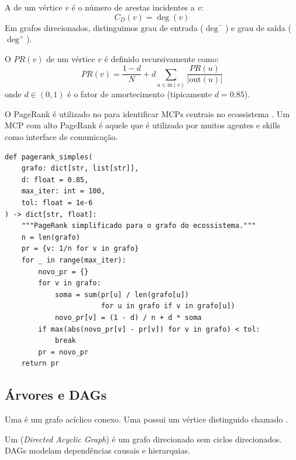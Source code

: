 \begin{definicao}
    A  de um vértice $v$ é o número de
    arestas incidentes a $v$:
    \[
    C_D(v) = \deg(v)
    \]
    Em grafos direcionados, distinguimos grau de entrada ($\deg^-$) e grau
    de saída ($\deg^+$).
\end{definicao}

\begin{definicao}[PageRank]
    O  $PR(v)$ de um vértice $v$ é definido
    recursivamente como:
    \[
    PR(v) = \frac{1-d}{N} + d \sum_{u \in \text{in}(v)}
    \frac{PR(u)}{|\text{out}(u)|}
    \]
    onde $d \in (0,1)$ é o fator de amortecimento (tipicamente $d = 0.85$).
\end{definicao}

\begin{exemplo}
    O PageRank é utilizado no \opencodeeco{} para identificar MCPs centrais
    no ecossistema \cite{opencode2026scanner}. Um MCP com alto PageRank é
    aquele que é utilizado por muitos agentes e skills como interface de
    comunicação.
    \begin{lstlisting}[style=pythonstyle]
def pagerank_simples(
    grafo: dict[str, list[str]],
    d: float = 0.85,
    max_iter: int = 100,
    tol: float = 1e-6
) -> dict[str, float]:
    """PageRank simplificado para o grafo do ecossistema."""
    n = len(grafo)
    pr = {v: 1/n for v in grafo}
    for _ in range(max_iter):
        novo_pr = {}
        for v in grafo:
            soma = sum(pr[u] / len(grafo[u])
                       for u in grafo if v in grafo[u])
            novo_pr[v] = (1 - d) / n + d * soma
        if max(abs(novo_pr[v] - pr[v]) for v in grafo) < tol:
            break
        pr = novo_pr
    return pr
    \end{lstlisting}
\end{exemplo}

\subsection{Árvores e DAGs}

\begin{definicao}[Árvore]
    Uma  é um grafo acíclico conexo. Uma  possui um vértice distinguido chamado .
\end{definicao}

\begin{definicao}[DAG]
    Um  (\textit{Directed Acyclic Graph}) é um grafo
    direcionado sem ciclos direcionados. DAGs modelam dependências causais
    e hierarquias.
\end{definicao}

